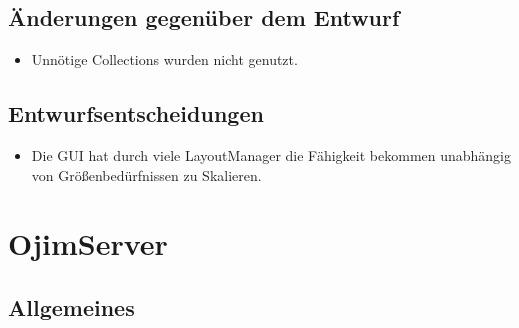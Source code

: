 \documentclass[a4paper,10pt]{article}
\begin{document}
\subsection{Änderungen gegenüber dem Entwurf}
\begin{itemize}
\item Unnötige Collections wurden nicht genutzt.
\end{itemize}

\subsection{Entwurfsentscheidungen}
\begin{itemize}
\item Die GUI hat durch viele LayoutManager die Fähigkeit bekommen unabhängig von Größenbedürfnissen zu Skalieren.
\end{itemize}
\newpage
\section{OjimServer}
\subsection{Allgemeines}
\end{document}
